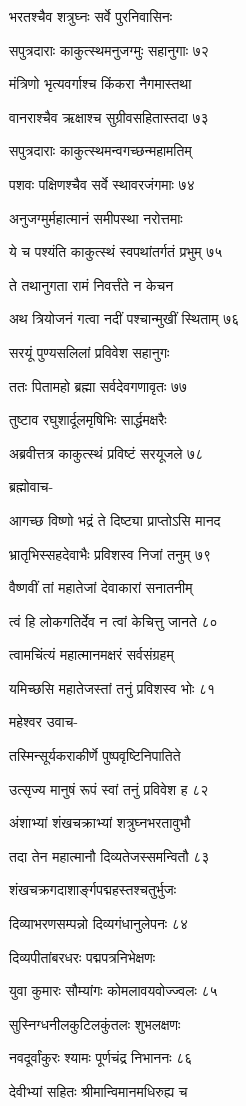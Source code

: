 भरतश्चैव शत्रुघ्नः सर्वे पुरनिवासिनः

सपुत्रदाराः काकुत्स्थमनुजग्मुः सहानुगाः ७२

मंत्रिणो भृत्यवर्गाश्च किंकरा नैगमास्तथा

वानराश्चैव ऋक्षाश्च सुग्रीवसहितास्तदा ७३

सपुत्रदाराः काकुत्स्थमन्वगच्छन्महामतिम्

पशवः पक्षिणश्चैव सर्वे स्थावरजंगमाः ७४

अनुजग्मुर्महात्मानं समीपस्था नरोत्तमाः

ये च पश्यंति काकुत्स्थं स्वपथांतर्गतं प्रभुम् ७५

ते तथानुगता रामं निवर्त्तंते न केचन

अथ त्रियोजनं गत्वा नदीं पश्चान्मुखीं स्थिताम् ७६

सरयूं पुण्यसलिलां प्रविवेश सहानुगः

ततः पितामहो ब्रह्मा सर्वदेवगणावृतः ७७

तुष्टाव रघुशार्दूलमृषिभिः सार्द्धमक्षरैः

अब्रवीत्तत्र काकुत्स्थं प्रविष्टं सरयूजले ७८

ब्रह्मोवाच-

आगच्छ विष्णो भद्रं ते दिष्ट्या प्राप्तोऽसि मानद

भ्रातृभिस्सहदेवाभैः प्रविशस्व निजां तनुम् ७९

वैष्णवीं तां महातेजां देवाकारां सनातनीम्

त्वं हि लोकगतिर्देव न त्वां केचित्तु जानते ८०

त्वामचिंत्यं महात्मानमक्षरं सर्वसंग्रहम्

यमिच्छसि महातेजस्तां तनुं प्रविशस्व भोः ८१

महेश्वर उवाच-

तस्मिन्सूर्यकराकीर्णे पुष्पवृष्टिनिपातिते

उत्सृज्य मानुषं रूपं स्वां तनुं प्रविवेश ह ८२

अंशाभ्यां शंखचक्राभ्यां शत्रुघ्नभरतावुभौ

तदा तेन महात्मानौ दिव्यतेजस्समन्वितौ ८३

शंखचक्रगदाशार्ङ्गपद्महस्तश्चतुर्भुजः

दिव्याभरणसम्पन्नो दिव्यगंधानुलेपनः ८४

दिव्यपीतांबरधरः पद्मपत्रनिभेक्षणः

युवा कुमारः सौम्यांगः कोमलावयवोज्ज्वलः ८५

सुस्निग्धनीलकुटिलकुंतलः शुभलक्षणः

नवदूर्वांकुरः श्यामः पूर्णचंद्र निभाननः ८६

देवीभ्यां सहितः श्रीमान्विमानमधिरुह्य च

